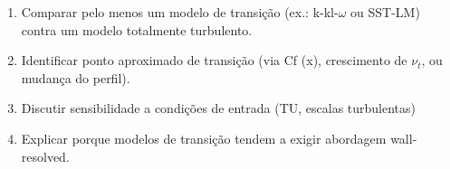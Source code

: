 \documentclass[12pt,a4paper]{article}
\begin{document}
\begin{enumerate}
            \begin{enumerate}

                \item Comparar pelo menos um modelo de transição (ex.: k-kl-$\omega$ ou SST-LM) contra um modelo totalmente turbulento.

                \item Identificar ponto aproximado de transição (via Cf (x), crescimento de $\nu_t$, ou mudan\c{c}a do perfil).

                \item Discutir sensibilidade a condições de entrada (TU, escalas turbulentas)

                \item Explicar porque modelos de transição tendem a exigir abordagem wall-resolved.
                
            \end{enumerate}
    
    \end{enumerate}
\end{document}

